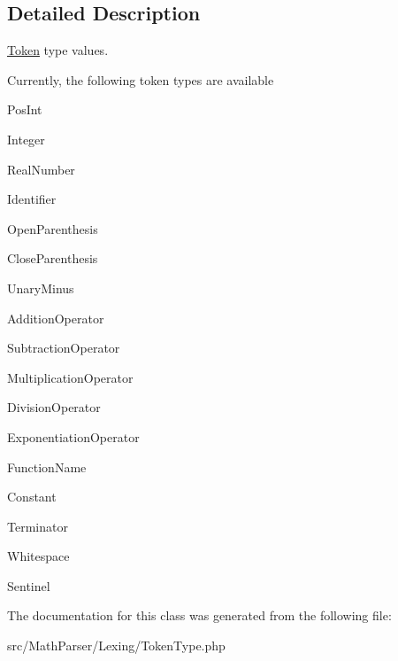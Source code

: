 \subsection{Detailed Description}
\hyperlink{classMathParser_1_1Lexing_1_1Token}{Token} type values. 

Currently, the following token types are available


\begin{DoxyItemize}
\item Pos\-Int
\item Integer
\item Real\-Number
\item Identifier
\item Open\-Parenthesis
\item Close\-Parenthesis
\item Unary\-Minus
\item Addition\-Operator
\item Subtraction\-Operator
\item Multiplication\-Operator
\item Division\-Operator
\item Exponentiation\-Operator
\item Function\-Name
\item Constant
\item Terminator
\item Whitespace
\item Sentinel 
\end{DoxyItemize}

The documentation for this class was generated from the following file\-:\begin{DoxyCompactItemize}
\item 
src/\-Math\-Parser/\-Lexing/Token\-Type.\-php\end{DoxyCompactItemize}
